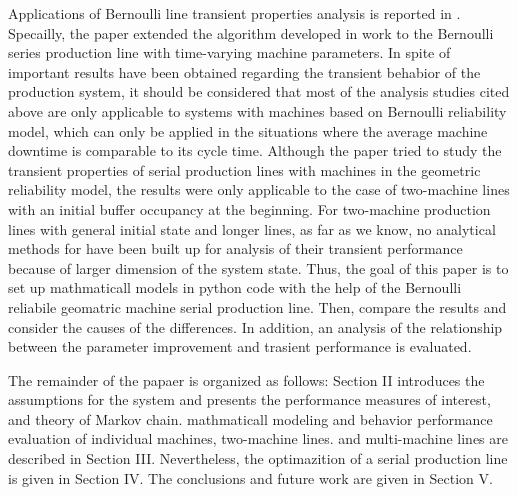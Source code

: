 Applications of Bernoulli line transient properties analysis is reported in \cite{chen2012energy, wang2010transient, chen2011feedback}. Specailly, the paper \cite{chen2012energy} extended the algorithm developed in work\cite{zhang2013transient} to the Bernoulli series production line with time-varying machine parameters. In spite of important results have been obtained regarding the transient behabior of the production system, it should be considered that most of the analysis studies cited above are only applicable to systems with machines based on Bernoulli reliability model, which can only be applied in the situations where the average machine downtime is comparable to its cycle time. Although the paper \cite{meerkov2010transient} tried to study the transient properties of serial production lines with machines in the geometric reliability model, the results were only applicable to the case of two-machine lines with an initial buffer occupancy at the beginning. For two-machine production lines with general initial state and longer lines, as far as we know, no analytical methods for have been built up for analysis of their transient performance because of larger dimension of the system state. Thus, the goal of this paper is to set up mathmaticall models in python code with the help of the Bernoulli reliabile geomatric machine serial production line. Then, compare the results and consider the causes of the differences. In addition, an analysis of the relationship between the parameter improvement and  trasient performance is evaluated.

The remainder of the papaer is organized as follows: Section II introduces the assumptions for the system and presents the performance measures of interest, and theory of Markov chain. mathmaticall modeling and behavior performance evaluation of individual machines, two-machine lines. and multi-machine lines are described in Section III. Nevertheless, the optimazition of a serial production line is given in Section IV. The conclusions and future work are given in Section V.